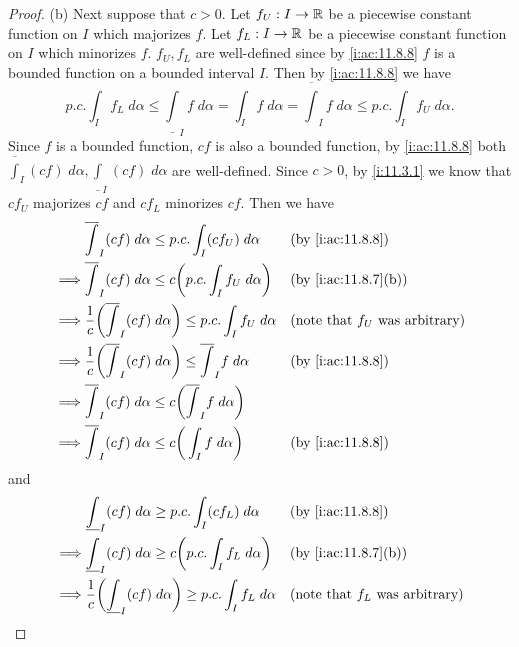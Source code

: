 \begin{proof}{(b)}
  Next suppose that \(c > 0\).
  Let \(f_U : I \to \mathbb{R}\) be a piecewise constant function on \(I\) which majorizes \(f\).
  Let \(f_L : I \to \mathbb{R}\) be a piecewise constant function on \(I\) which minorizes \(f\).
  \(f_U, f_L\) are well-defined since by \cref{i:ac:11.8.8} \(f\) is a bounded function on a bounded interval \(I\).
  Then by \cref{i:ac:11.8.8} we have
  \[
    p.c. \int_I f_L \; d \alpha \leq \underline{\int}_I f \; d \alpha = \int_I f \; d \alpha = \overline{\int}_I f \; d \alpha \leq p.c. \int_I f_U \; d \alpha.
  \]
  Since \(f\) is a bounded function, \(cf\) is also a bounded function, by \cref{i:ac:11.8.8} both \(\overline{\int}_I (cf) \; d \alpha, \underline{\int}_I (cf) \; d \alpha\) are well-defined.
  Since \(c > 0\), by \cref{i:11.3.1} we know that \(c f_U\) majorizes \(c f\) and \(c f_L\) minorizes \(c f\).
  Then we have
  \begin{align*}
             & \overline{\int}_I (cf) \; d \alpha \leq p.c. \int_I (c f_U) \; d \alpha                          &  & \by{i:ac:11.8.8}                         \\
    \implies & \overline{\int}_I (cf) \; d \alpha \leq c \bigg(p.c. \int_I f_U \; d \alpha\bigg)                &  & \by{i:ac:11.8.7}[b]                      \\
    \implies & \dfrac{1}{c} \bigg(\overline{\int}_I (cf) \; d \alpha\bigg) \leq p.c. \int_I f_U \; d \alpha     &  & \text{(note that \(f_U\) was arbitrary)} \\
    \implies & \dfrac{1}{c} \bigg(\overline{\int}_I (cf) \; d \alpha\bigg) \leq \overline{\int}_I f \; d \alpha &  & \by{i:ac:11.8.8}                         \\
    \implies & \overline{\int}_I (cf) \; d \alpha \leq c\bigg(\overline{\int}_I f \; d \alpha\bigg)                                                           \\
    \implies & \overline{\int}_I (cf) \; d \alpha \leq c\bigg(\int_I f \; d \alpha\bigg)                        &  & \by{i:ac:11.8.8}
  \end{align*}
  and
  \begin{align*}
             & \underline{\int}_I (cf) \; d \alpha \geq p.c. \int_I (c f_L) \; d \alpha                           &  & \by{i:ac:11.8.8}                         \\
    \implies & \underline{\int}_I (cf) \; d \alpha \geq c \bigg(p.c. \int_I f_L \; d \alpha\bigg)                 &  & \by{i:ac:11.8.7}[b]                      \\
    \implies & \dfrac{1}{c} \bigg(\underline{\int}_I (cf) \; d \alpha\bigg) \geq p.c. \int_I f_L \; d \alpha      &  & \text{(note that \(f_L\) was arbitrary)} \\

\end{align*}
\end{proof}
